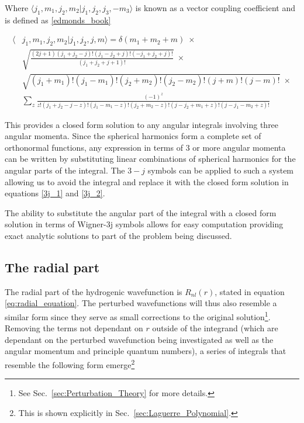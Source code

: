         Where $\langle j_1, m_1, j_2, m_2 \vert j_1, j_2, j_3, - m_3 \rangle$ is known as a vector coupling coefficient and is defined as \ref{edmonds_book}

        \small
        \begin{align}
            \langle &j_1, m_1, j_2, m_2 \vert j_1, j_2, j, m \rangle = \delta(m_1 + m_2 + m) \;\times \label{3j_2}\\
            &\sqrt{\frac{(2j+1)(j_1 + j_2 - j)!(j_1 - j_2 + j)!(-j_1 + j_2 + j)!}{(j_1 + j_2 + j + 1)!}}\;\times \nonumber\\
            &\sqrt{(j_1 + m_1)!(j_1 - m_1)!(j_2 + m_2)!(j_2 - m_2)!(j+m)!(j-m)!} \; \times \nonumber\\
            & \sum_z \frac{(-1)^z}{z!(j_1 + j_2 - j - z)!(j_1 - m_1 - z)!(j_2 + m_2 - z)!(j-j_2+m_1+z)!(j-j_1-m_2 + z)!} \nonumber
        \end{align}

        \normalsize
        This provides a closed form solution to any angular integrals involving three angular momenta. Since the spherical harmonics form a complete set of orthonormal functions, any expression in terms of 3 or more angular momenta can be written by substituting linear combinations of spherical harmonics for the angular parts of the integral. The $3-j$ symbols can be applied to such a system allowing us to avoid the integral and replace it with the closed form solution in equations \eqref{3j_1} and \eqref{3j_2}. 
    
        The ability to substitute the angular part of the integral with a closed form solution in terms of Wigner-3j symbols allows for easy computation providing exact analytic solutions to part of the problem being discussed.

        \subsection{The radial part} \label{sec:The_Radial_Part}
            The radial part of the hydrogenic wavefunction is $R_{nl}(r)$, stated in equation \ref{eq:radial_equation}. The perturbed wavefunctions will thus also resemble a similar form since they serve as small corrections to the original solution\footnote{See Sec.~\ref{sec:Perturbation_Theory} for more details.}. Removing the terms not dependant on $r$ outside of the integrand (which are dependant on the perturbed wavefunction being investigated as well as the angular momentum and principle quantum numbers), a series of integrals that resemble the following form emerge\footnote{This is shown explicitly in Sec.~\ref{sec:Laguerre_Polynomial}.}

